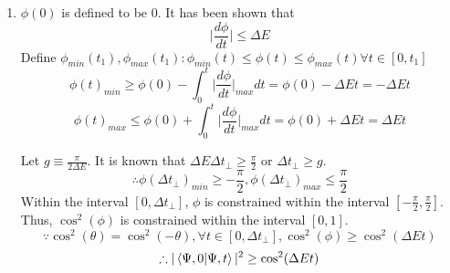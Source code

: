 \begin{sol}
\begin{enumerate}[label=\textbf{(\alph*)}]
\begin{proof}
\end{proof}
The minimum time it will take for the system to evolve into an orthogonal state can be computed with
$$\int_0^{t_{min}}\frac{d\phi}{dt}dt=\frac{\pi}{2}$$
As the minimum time is concerned, the maximum value of $\frac{d\phi}{dt}$ can be used. Due to Lemma 11, the maximum value is $\Delta E$, resulting in
$$\int_0^{t_{min}}\Delta Edt=\frac{\pi}{2}$$
$$t_{min}\Delta E=\frac{\pi}{2}$$
Since $t_{min}$ is the minimum time required, a general inequality can be constructed to be
$$\Delta E\Delta t_\perp\geq\frac{\pi}{2}$$

\item
 $\phi(0)$ is defined to be $0$. It has been shown that 
$$\bigg|\frac{d\phi}{dt}\bigg|\leq \Delta E$$
Define $\phi_{min}(t_1),\phi_{max}(t_1):\phi_{min}(t)\leq\phi(t)\leq\phi_{max}(t)\forall t\in[0,t_1]$  
$$\phi(t)_{min}\geq\phi(0)-\int_0^t\bigg|\frac{d\phi}{dt}\bigg|_{max}dt=\phi(0)-\Delta Et=-\Delta Et$$
$$\phi(t)_{max}\leq\phi(0)+\int_0^t\bigg|\frac{d\phi}{dt}\bigg|_{max}dt=\phi(0)+\Delta Et=\Delta Et
$$

Let $\displaystyle{g\equiv\frac{\pi}{2\Delta E}}$. It is known that $\displaystyle{\Delta E\Delta t_\perp\geq\frac{\pi}{2}}$ or $\Delta t_\perp\geq g$.
$$\therefore \phi(\Delta t_\perp)_{min}\geq-\frac{\pi}{2},\phi(\Delta t_\perp)_{max}\leq\frac{\pi}{2}$$
Within the interval $[0,\Delta t_\perp]$, $\phi$ is constrained within the interval $\left[-\frac{\pi}{2},\frac{\pi}{2}\right]$. Thus, $\cos^2(\phi)$ is constrained within the interval $[0,1]$. 
$$\because\cos^2(\theta)=\cos^2(-\theta), \forall t\in[0,\Delta t_\perp], \cos^2(\phi)\geq\cos^2(\Delta Et)$$ $$\therefore|\braket{\Psi,0}{\Psi,t}|^2\geq\cos^2(\Delta Et)$$ 


\end{enumerate}
\end{sol}